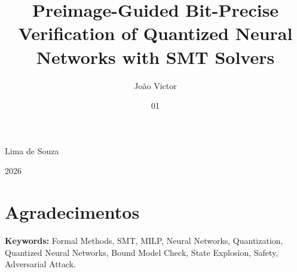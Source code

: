   \title{Preimage-Guided Bit-Precise Verification of Quantized Neural Networks with SMT Solvers}
  
  
  \author{João Victor}{Lima de Souza}
  
  \date{01}{2026}


\maketitle


\thispagestyle{empty}

\dedication{I would like to dedicate...}

\chapter*{Agradecimentos}





\begin{foreignabstract}


\textbf{Keywords:} Formal Methods, SMT, MILP, Neural Networks, Quantization, Quantized Neural Networks, Bound Model Check, State Explosion, Safety, Adversarial Attack.
\end{foreignabstract}
   \pagestyle{plain}
   \lhead[\fancyplain{}{\bfseries\tiny\thepage}]{\fancyplain{}{\bfseries\tiny\rightmark}}
   \rhead[\fancyplain{}{\bfseries\tiny\leftmark}]{}

  \tableofcontents
  \listoffigures
  \listoftables